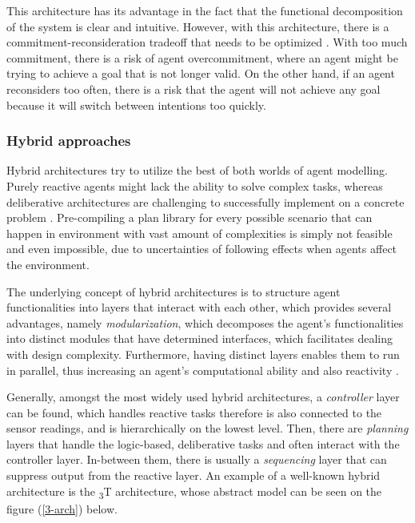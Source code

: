 \documentclass[main.tex]{subfiles}
\begin{document}
This architecture has its advantage in the fact that the functional decomposition of the system
is clear and intuitive. However, with this architecture, there is a commitment-reconsideration
tradeoff that needs to be optimized \cite{Wooldridge1999}. With too much commitment, there is a
risk of agent overcommitment, where an agent might be trying to achieve a goal that is not
longer valid. On the other hand, if an agent reconsiders too often, there is a risk that the
agent will not achieve any goal because it will switch between intentions too quickly.

\subsubsection{Hybrid approaches}\label{hybrid-arch}

Hybrid architectures try to utilize the best of both worlds of agent modelling. Purely reactive 
agents might lack the ability to solve complex tasks, whereas deliberative architectures are 
challenging to successfully implement on a concrete problem \cite{Anthony2014}. Pre-compiling a plan
library for every possible scenario that can happen in environment with vast amount of complexities
is simply not feasible and even impossible, due to uncertainties of following effects when agents 
affect the environment. 

The underlying concept of hybrid architectures is to structure agent functionalities into layers 
that interact with each other, which provides several advantages, namely \emph{modularization},
which decomposes the agent's functionalities into distinct modules that have determined 
interfaces, which facilitates dealing with design complexity. Furthermore, having distinct layers enables 
them to run in parallel, thus increasing an agent's computational ability and also reactivity
\cite{Mueller1999}.

Generally, amongst the most widely used hybrid architectures, a \emph{controller} layer can be
found, which handles reactive tasks therefore is also connected to the sensor readings, and is 
hierarchically on the lowest level. Then, there are \emph{planning} layers that handle the
logic-based, deliberative tasks and often interact with the controller layer. In-between them, 
there is usually a \emph{sequencing} layer that can suppress output from the reactive layer. 
An example of a well-known hybrid architecture is the \textsubscript{3}T architecture, whose 
abstract model can be seen on the figure (\ref{3-arch}) below.
\end{document}
